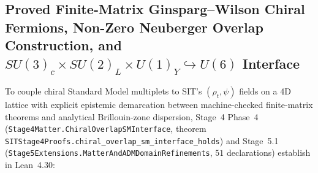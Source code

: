 \subsection{Proved Finite-Matrix Ginsparg--Wilson Chiral Fermions, Non-Zero Neuberger Overlap Construction, and $SU(3)_c\times SU(2)_L\times U(1)_Y \hookrightarrow U(6)$ Interface}

To couple chiral Standard Model multiplets to SIT's $(\rho_t, \psi)$ fields on a 4D lattice with explicit epistemic demarcation between machine-checked finite-matrix theorems and analytical Brillouin-zone dispersion, Stage~4 Phase~4 (\texttt{Stage4\allowbreak{}Matter.\allowbreak{}Chiral\allowbreak{}Overlap\allowbreak{}SMInterface}, theorem \texttt{SITStage4\allowbreak{}Proofs.\allowbreak{}chiral\_\allowbreak{}overlap\_\allowbreak{}sm\_\allowbreak{}interface\_\allowbreak{}holds}) and Stage~5.1 (\texttt{Stage5\allowbreak{}Extensions.\allowbreak{}Matter\allowbreak{}And\allowbreak{}ADMDomain\allowbreak{}Refinements}, $51$ declarations) establish in Lean~4.30:
